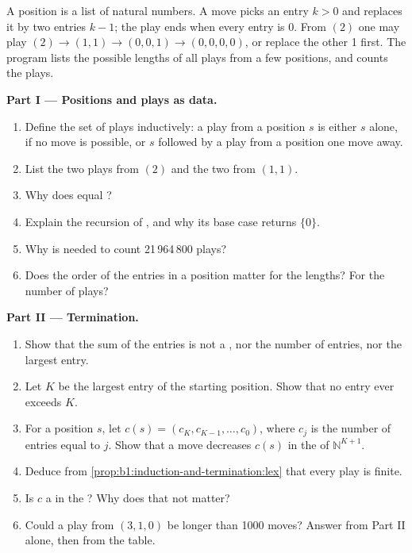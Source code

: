 \begin{problem}\label{pb:b1:induction-and-termination:1}
A position is a list of natural numbers. A move picks an entry $k > 0$ and replaces it by two entries $k - 1$; the play
ends when every entry is 0. From $(2)$ one may play $(2) \to (1, 1) \to (0, 0, 1) \to (0, 0, 0, 0)$, or replace the
other 1 first. The program lists the possible lengths of all plays from a few positions, and counts the plays.
\label{lst:b1:induction-and-termination:game}
\label{out:b1:induction-and-termination:game}

\medskip\noindent\textbf{Part I --- Positions and plays as data.}
\begin{enumerate}
\item Define the set of plays inductively: a play from a position $s$ is either $s$ alone, if no move is possible, or
$s$ followed by a play from a position one move away.
\item List the two plays from $(2)$ and the two from $(1, 1)$.
\item Why does  equal ?
\item Explain the recursion of , and why its base case returns $\{0\}$.
\item Why is  needed to count 21\,964\,800 plays?
\item Does the order of the entries in a position matter for the lengths? For the number of plays?
\end{enumerate}

\medskip\noindent\textbf{Part II --- Termination.}
\begin{enumerate}[resume]
\item Show that the sum of the entries is not a , nor the number of entries, nor the largest entry.
\item Let $K$ be the largest entry of the starting position. Show that no entry ever exceeds $K$.
\item For a position $s$, let $c(s) = (c_K, c_{K-1}, \dots, c_0)$, where $c_j$ is the number of entries equal to $j$.
Show that a move decreases $c(s)$ in the  of $\mathbb{N}^{K+1}$.
\item Deduce from \cref{prop:b1:induction-and-termination:lex} that every play is finite.
\item Is $c$ a  in the ? Why does that not matter?
\item Could a play from $(3, 1, 0)$ be longer than 1000 moves? Answer from Part II alone, then from the table.
\end{enumerate}


\end{problem}
